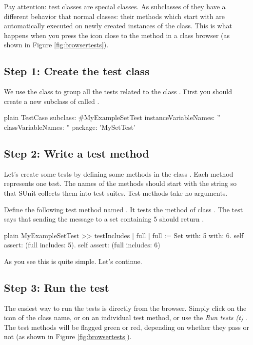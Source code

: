 \documentclass[10pt,twoside,english]{_support/latex/sbabook/sbabook}
\begin{document}
Pay attention: test classes are special classes. As subclasses of  they have a different behavior that normal classes: their methods which start with  are automatically executed on newly created instances of the class. This is what happens when you press the icon close to the method in a class browser (as shown in Figure \ref{fig:browsertests}).
\subsection{Step 1: Create the test class}
We use the class  to group all the tests related to the class . First you should create a new subclass of  called . 

\begin{displaycode}{plain}
TestCase subclass: #MyExampleSetTest
	instanceVariableNames: ''
	classVariableNames: ''
	package: 'MySetTest'
\end{displaycode}
\subsection{Step 2: Write a test method}
Let's create some tests by defining some methods in the class
. Each method represents one test. The names of the methods
should start with the string  so that SUnit collects them into
test suites. Test methods take no arguments.

Define the following test method named . It tests
the  method of class . The test says that sending the message
 to a set containing 5 should return . 

\begin{displaycode}{plain}
MyExampleSetTest >> testIncludes
	| full |
	full := Set with: 5 with: 6.
	self assert: (full includes: 5).
	self assert: (full includes: 6)
\end{displaycode}

As you see this is quite simple. Let's continue.
\subsection{Step 3: Run the test}
The easiest way to run the tests is directly from the browser. Simply click on
the icon of the class name, or on an individual test method, or use the  \textit{Run
tests (t)} . The test methods will be flagged green or red,
depending on whether they pass or not (as shown in Figure \ref{fig:browsertests}).
\end{document}
